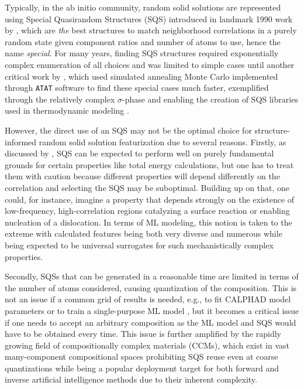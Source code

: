 Typically, in the ab initio community, random solid solutions are represented using Special Quasirandom Structures (SQS) introduced in landmark 1990 work by \citet{Zunger1990SpecialStructures}, which are \emph{the} best structures to match neighborhood correlations in a purely random state given component ratios and number of atoms to use, hence the name \emph{special}. For many years, finding SQS structures required exponentially complex enumeration of all choices and was limited to simple cases until another critical work by \citet{VanDeWalle2013EfficientStructures}, which used simulated annealing Monte Carlo implemented through \texttt{ATAT} software to find these special cases much faster, exemplified through the relatively complex $\sigma$-phase and enabling the creation of SQS libraries used in thermodynamic modeling \cite{vandeWalle2017SoftwareData}.

However, the direct use of an SQS may not be the optimal choice for structure-informed random solid solution featurization due to several reasons. Firstly, as discussed by \citet{VanDeWalle2013EfficientStructures}, SQS can be expected to perform well on purely fundamental grounds for certain properties like total energy calculations, but one has to treat them with caution because different properties will depend differently on the correlation and selecting the SQS may be suboptimal. Building up on that, one could, for instance, imagine a property that depends strongly on the existence of low-frequency, high-correlation regions catalyzing a surface reaction or enabling nucleation of a dislocation. In terms of ML modeling, this notion is taken to the extreme with calculated features being both very diverse and numerous while being expected to be universal surrogates for such mechanistically complex properties.

Secondly, SQSs that can be generated in a reasonable time are limited in terms of the number of atoms considered, causing quantization of the composition. This is not an issue if a common grid of results is needed, e.g., to fit CALPHAD model parameters \cite{vandeWalle2017SoftwareData} or to train a single-purpose ML model \cite{Tandoc2023MiningAlloys}, but it becomes a critical issue if one needs to accept an arbitrary composition as the ML model and SQS would have to be obtained every time. This issue is further amplified by the rapidly growing field of compositionally complex materials (CCMs), which exist in vast many-component compositional spaces prohibiting SQS reuse even at coarse quantizations \cite{Krajewski2024Nimplex} while being a popular deployment target for both forward and inverse artificial intelligence methods \cite{Catal2023MachineProperties, Rao2022MachineDiscovery, Debnath2023ComparingAlloys} due to their inherent complexity.


